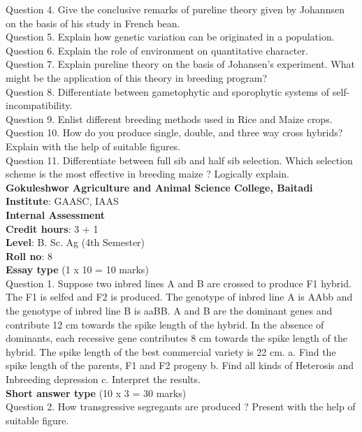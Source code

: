 \documentclass[12pt]{article}\usepackage[]{graphicx}\usepackage[]{color}
\begin{document}
Question 4. Give the conclusive remarks of pureline theory given by Johannsen on the basis of his study in French bean.\\
Question 5. Explain how genetic variation can be originated in a population.\\
Question 6. Explain the role of environment on quantitative character.\\
Question 7. Explain pureline theory on the basis of Johansen's experiment. What might be the application of this theory in breeding program?\\
Question 8. Differentiate between gametophytic and sporophytic systems of self-incompatibility.\\
Question 9. Enlist different breeding methods used in Rice and Maize crops.\\
Question 10. How do you produce single, double, and three way cross hybrids? Explain with the help of suitable figures.\\
Question 11. Differentiate between full sib and half sib selection. Which selection scheme is the most effective in breeding maize ? Logically explain.\\
\clearpage 
{\centering \Large{\textbf{Gokuleshwor Agriculture and Animal Science College, Baitadi}} \\[0.25cm]
            \textbf{Institute}: GAASC, IAAS \\[0.2cm]
            \textbf{Internal Assessment} \\[0.2cm]} 
\textbf{Credit hours}: 3 + 1 \\ 
\textbf{Level}: B. Sc. Ag (4th Semester) \\
\textbf{Roll no}: 8 \\[0.5cm] 
\textbf{Essay type} (1 x 10 = 10 marks) \\
Question 1. Suppose two inbred lines A and B are crossed to produce F1 hybrid. The F1 is selfed and F2 is produced. The genotype of inbred line A is AAbb and the genotype of inbred line B is aaBB. A and B are the dominant genes and contribute 12 cm towards the spike length of the hybrid. In the absence of dominants, each recessive gene contributes 8 cm towards the spike length of the hybrid. The spike length of the best commercial variety is 22 cm. a. Find the spike length of the parents, F1 and F2 progeny b. Find all kinds of Heterosis and Inbreeding depression c. Interpret the results.\\
\textbf{Short answer type} (10 x 3 = 30 marks) \\
Question 2. How transgressive segregants are produced ? Present with the help of suitable figure.\\
\end{document}
